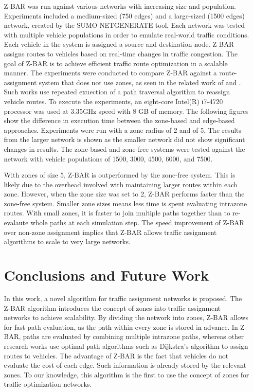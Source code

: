 \documentclass[conference]{IEEEtran}
\begin{document}
Z-BAR was run against various networks with increasing size and population. Experiments included a medium-sized (750 edges) and a large-sized (1500 edges) network, created by the SUMO NETGENERATE tool. Each network was tested with multiple vehicle populations in order to emulate real-world traffic conditions. Each vehicle in the system is assigned a source and destination node. Z-BAR assigns routes to vehicles based on real-time changes in traffic congestion. The goal of Z-BAR is to achieve efficient traffic route optimization in a scalable manner. The experiments were conducted to compare Z-BAR against a route-assignment system that does not use zones, as seen in the related work of \cite{iaco} and \cite{dtpos}. Such works use repeated exuection of a path traversal algorithm to reassign vehicle routes. To execute the experiments, an eight-core Intel(R) i7-4720 processor was used at 3.35GHz speed with 8 GB of memory. The following figures show the difference in execution time between the zone-based and edge-based approaches. Experiments were run with a zone radius of 2 and of 5. The results from the larger network is shown as the smaller network did not show significant changes in results. The zone-based and zone-free systems were tested against the network with vehicle populations of 1500, 3000, 4500, 6000, and 7500.




With zones of size 5, Z-BAR is outperformed by the zone-free system. This is likely due to the overhead involved with maintaining larger routes within each zone. However, when the zone size was set to 2, Z-BAR performs faster than the zone-free system. Smaller zone sizes means less time is spent evaluating intrazone routes. With small zones, it is faster to join multiple paths together than to re-evalaute whole paths at each simulation step. The speed improvement of Z-BAR over non-zone assignment implies that Z-BAR allows traffic assignment algorithms to scale to very large networks.

\section{Conclusions and Future Work} %

In this work, a novel algorithm for traffic assignment networks is proposed. The Z-BAR algorithm introduces the concept of zones into traffic assignment networks to achieve scalability. By dividing the network into zones, Z-BAR allows for fast path evaluation, as the path within every zone is stored in advance. In Z-BAR, paths are evaluated by combining multiple intrazone paths, whereas other research works use optimal-path algorithms such as Dijkstra's algorithm to assign routes to vehicles. The advantage of Z-BAR is the fact that vehicles do not evaluate the cost of each edge. Such information is already stored by the relevant zones. To our knowledge, this algorithm is the first to use the concept of zones for traffic optimization networks. 
\end{document}
